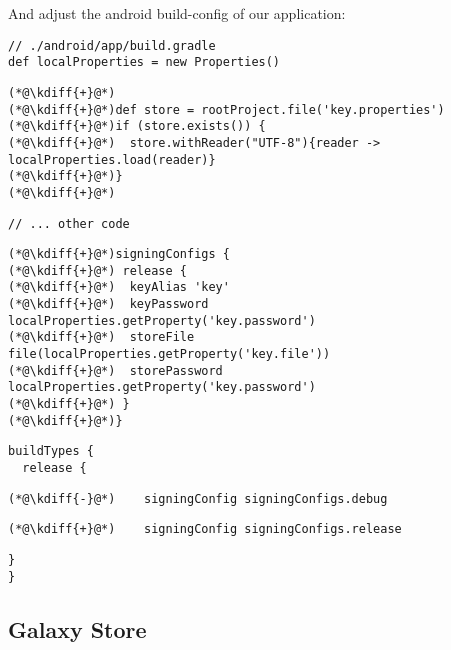 \noindent And adjust the android build-config of our application:\\

{
\xpretocmd{\lstlisting}{\vspace{-12pt}}{}{}
\begin{lstlisting}
// ./android/app/build.gradle
def localProperties = new Properties()
\end{lstlisting}
\begin{lstlisting}[firstnumber=3, backgroundcolor=\color{backgreen}]
(*@\kdiff{+}@*)
(*@\kdiff{+}@*)def store = rootProject.file('key.properties')
(*@\kdiff{+}@*)if (store.exists()) {
(*@\kdiff{+}@*)  store.withReader("UTF-8"){reader -> localProperties.load(reader)}
(*@\kdiff{+}@*)}
(*@\kdiff{+}@*)
\end{lstlisting}
\begin{lstlisting}[firstnumber=9]
// ... other code
\end{lstlisting}
\begin{lstlisting}[firstnumber=63, backgroundcolor=\color{backgreen}]
(*@\kdiff{+}@*)signingConfigs {
(*@\kdiff{+}@*) release {
(*@\kdiff{+}@*)  keyAlias 'key'
(*@\kdiff{+}@*)  keyPassword localProperties.getProperty('key.password')
(*@\kdiff{+}@*)  storeFile file(localProperties.getProperty('key.file'))
(*@\kdiff{+}@*)  storePassword localProperties.getProperty('key.password')
(*@\kdiff{+}@*) }
(*@\kdiff{+}@*)}
\end{lstlisting}
\begin{lstlisting}[firstnumber=71]
buildTypes {
  release {
\end{lstlisting}
\begin{lstlisting}[firstnumber=73, backgroundcolor=\color{backred}]
(*@\kdiff{-}@*)    signingConfig signingConfigs.debug
\end{lstlisting}
\begin{lstlisting}[firstnumber=73, backgroundcolor=\color{backgreen}]
(*@\kdiff{+}@*)    signingConfig signingConfigs.release
\end{lstlisting}
\begin{lstlisting}[firstnumber=74]
  }
}
\end{lstlisting}
}


\subsection{Galaxy Store}

